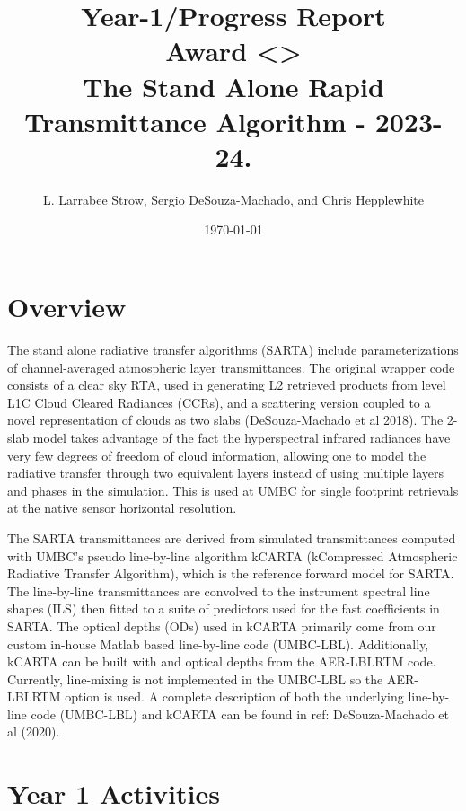\documentclass[11pt,twocolumn]{article}
\date{}
\title{}
\begin{document}
\author{L. Larrabee Strow, Sergio DeSouza-Machado, and Chris Hepplewhite}
\date{\today}
\title{\Large Year-1/Progress Report\\ \vspace{0.05in} \normalsize Award <>
  \\The Stand Alone Rapid Transmittance Algorithm - 2023-24.}
\maketitle

\section{Overview}
\label{sec:orgbcbb29e}
The stand alone radiative transfer algorithms (SARTA) include
parameterizations
of channel-averaged atmospheric layer transmittances. The original
wrapper code consists of a clear sky RTA, used in generating 
L2 retrieved products from level L1C Cloud Cleared Radiances
(CCRs), and a scattering version coupled to a novel representation
of clouds as two slabs (DeSouza-Machado et al 2018).
The 2-slab model takes advantage of the fact the
hyperspectral infrared radiances have very few degrees of freedom of cloud
information, allowing one to model the radiative transfer through two
equivalent layers instead of using multiple layers and phases in the
simulation. This is used at UMBC for single footprint
retrievals at the native sensor horizontal resolution.

The SARTA transmittances are derived from simulated
transmittances computed with UMBC's pseudo line-by-line algorithm kCARTA
(kCompressed Atmospheric Radiative Transfer Algorithm), which is the
reference forward model for SARTA. The line-by-line transmittances are
convolved to the instrument spectral line shapes (ILS) then fitted to a suite
of predictors used for the fast coefficients in SARTA.
The optical depths (ODs) used in kCARTA
primarily come from our custom in-house Matlab based line-by-line code
(UMBC-LBL). Additionally, kCARTA can be built with \cd and
\methane optical depths from the AER-LBLRTM code. Currently,
\methane line-mixing is not implemented in the UMBC-LBL so the AER-LBLRTM
option is used.
A complete description of both the underlying
line-by-line code (UMBC-LBL) and kCARTA can be found in
ref: DeSouza-Machado et al (2020).


\section{Year 1 Activities}
\label{sec:org49dfcce}
\end{document}
